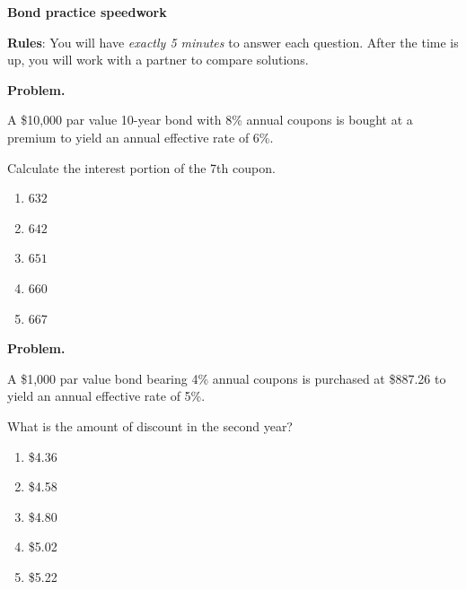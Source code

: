 \documentclass[11pt]{article}
\begin{document}
\begin{center}
{\Huge \textbf{Bond practice speedwork}}\\
\vspace{0.3em}
\end{center}


\bigskip

\bigskip

\bigskip

\bigskip
\bigskip

\bigskip

\bigskip

\bigskip

\begin{center}
    \begin{Large}
        \textbf{Rules}: You will have \textit{exactly 5 minutes} to answer each question. After the time is up, you will work with a partner to compare solutions.
    \end{Large}
\end{center}


\newpage



\textbf{Problem.}

A \$10{,}000 par value 10-year bond with 8\% annual coupons is bought at a premium to yield an annual effective rate of 6\%.

Calculate the interest portion of the 7th coupon.

\begin{enumerate}[label=\Alph*.]
    \item $632$
    \item $642$
    \item $651$
    \item $660$
    \item $667$
\end{enumerate}


\newpage

\textbf{Problem.}

A \$1{,}000 par value bond bearing 4\% annual coupons is purchased at \$887.26 to yield an annual effective rate of 5\%.

What is the amount of discount in the second year?

\begin{enumerate}[label=\Alph*.]
    \item \$4.36
    \item \$4.58
    \item \$4.80
    \item \$5.02
    \item \$5.22
\end{enumerate}
\end{document}
